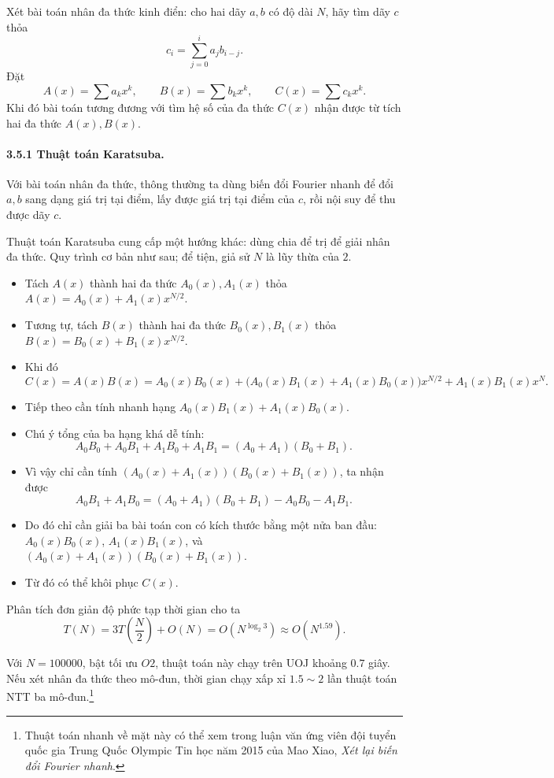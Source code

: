 \documentclass[11pt]{article}
\begin{document}
Xét bài toán nhân đa thức kinh điển: cho hai dãy \(a,b\) có độ dài \(N\), hãy
tìm dãy \(c\) thỏa
\[
  c_i=\sum_{j=0}^{i}a_jb_{i-j}.
\]
Đặt
\[
  A(x)=\sum a_kx^k,\qquad B(x)=\sum b_kx^k,\qquad C(x)=\sum c_kx^k.
\]
Khi đó bài toán tương đương với tìm hệ số của đa thức \(C(x)\) nhận được từ
tích hai đa thức \(A(x),B(x)\).

\paragraph{3.5.1 Thuật toán Karatsuba.}
Với bài toán nhân đa thức, thông thường ta dùng biến đổi Fourier nhanh để đổi
\(a,b\) sang dạng giá trị tại điểm, lấy được giá trị tại điểm của \(c\), rồi
nội suy để thu được dãy \(c\).

Thuật toán Karatsuba cung cấp một hướng khác: dùng chia để trị để giải nhân đa
thức. Quy trình cơ bản như sau; để tiện, giả sử \(N\) là lũy thừa của \(2\).

\begin{itemize}
  \item Tách \(A(x)\) thành hai đa thức \(A_0(x),A_1(x)\) thỏa
  \(A(x)=A_0(x)+A_1(x)x^{N/2}\).
  \item Tương tự, tách \(B(x)\) thành hai đa thức \(B_0(x),B_1(x)\) thỏa
  \(B(x)=B_0(x)+B_1(x)x^{N/2}\).
  \item Khi đó
  \[
    C(x)=A(x)B(x)
    =
    A_0(x)B_0(x)
    +
    \bigl(A_0(x)B_1(x)+A_1(x)B_0(x)\bigr)x^{N/2}
    +
    A_1(x)B_1(x)x^N .
  \]
  \item Tiếp theo cần tính nhanh hạng
  \(A_0(x)B_1(x)+A_1(x)B_0(x)\).
  \item Chú ý tổng của ba hạng khá dễ tính:
  \[
    A_0B_0+A_0B_1+A_1B_0+A_1B_1=(A_0+A_1)(B_0+B_1).
  \]
  \item Vì vậy chỉ cần tính \((A_0(x)+A_1(x))(B_0(x)+B_1(x))\), ta nhận được
  \[
    A_0B_1+A_1B_0=(A_0+A_1)(B_0+B_1)-A_0B_0-A_1B_1.
  \]
  \item Do đó chỉ cần giải ba bài toán con có kích thước bằng một nửa ban đầu:
  \(A_0(x)B_0(x)\), \(A_1(x)B_1(x)\), và
  \((A_0(x)+A_1(x))(B_0(x)+B_1(x))\).
  \item Từ đó có thể khôi phục \(C(x)\).
\end{itemize}

Phân tích đơn giản độ phức tạp thời gian cho ta
\[
  T(N)=3T\left(\frac{N}{2}\right)+O(N)
  =
  O(N^{\log_2 3})
  \approx O(N^{1.59}).
\]

Với \(N=100000\), bật tối ưu \(O2\), thuật toán này chạy trên UOJ khoảng
\(0.7\) giây. Nếu xét nhân đa thức theo mô-đun, thời gian chạy xấp xỉ
\(1.5\sim 2\) lần thuật toán NTT ba mô-đun.\footnote{Thuật toán nhanh về mặt
này có thể xem trong luận văn ứng viên đội tuyển quốc gia Trung Quốc Olympic
Tin học năm 2015 của Mao Xiao, \emph{Xét lại biến đổi Fourier nhanh}.}
\end{document}
